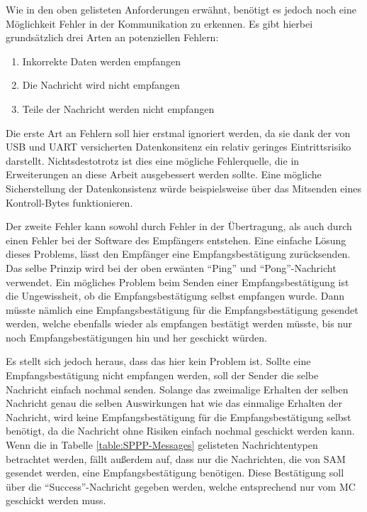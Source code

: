 Wie in den oben gelisteten Anforderungen erwähnt, benötigt es jedoch noch eine Möglichkeit Fehler in der Kommunikation zu erkennen.
Es gibt hierbei grundsätzlich drei Arten an potenziellen Fehlern:

\begin{enumerate}
    \item Inkorrekte Daten werden empfangen
    \item Die Nachricht wird nicht empfangen
    \item Teile der Nachricht werden nicht empfangen
\end{enumerate}

Die erste Art an Fehlern soll hier erstmal ignoriert werden, da sie dank der von USB und \ac{UART} versicherten Datenkonsitenz ein relativ geringes Eintrittsrisiko darstellt.
Nichtsdestotrotz ist dies eine mögliche Fehlerquelle, die in Erweiterungen an diese Arbeit ausgebessert werden sollte.
Eine mögliche Sicherstellung der Datenkonsistenz würde beispielsweise über das Mitsenden eines Kontroll-Bytes funktionieren.

Der zweite Fehler kann sowohl durch Fehler in der Übertragung, als auch durch einen Fehler bei der Software des Empfängers entstehen.
Eine einfache Lösung dieses Problems, lässt den Empfänger eine Empfangsbestätigung zurücksenden.
Das selbe Prinzip wird bei der oben erwänten \enquote{Ping} und \enquote{Pong}-Nachricht verwendet.
Ein mögliches Problem beim Senden einer Empfangsbestätigung ist die Ungewissheit, ob die Empfangsbestätigung selbst empfangen wurde. \newline
Dann müsste nämlich eine Empfangsbestätigung für die Empfangsbestätigung gesendet werden, welche ebenfalls wieder als empfangen bestätigt werden müsste, bis nur noch Empfangsbestätigungen hin und her geschickt würden.

Es stellt sich jedoch heraus, dass das hier kein Problem ist.
Sollte eine Empfangsbestätigung nicht empfangen werden, soll der Sender die selbe Nachricht einfach nochmal senden. \newline
Solange das zweimalige Erhalten der selben Nachricht genau die selben Auswirkungen hat wie das einmalige Erhalten der Nachricht, wird keine Empfangsbestätigung für die Empfangsbestätigung selbst benötigt, da die Nachricht ohne Risiken einfach nochmal geschickt werden kann.
Wenn die in Tabelle \ref{table:SPPP-Messages} gelisteten Nachrichtentypen betrachtet werden, fällt außerdem auf, dass nur die Nachrichten, die von \ac{SAM} gesendet werden, eine Empfangsbestätigung benötigen.
Diese Bestätigung soll über die \enquote{Success}-Nachricht gegeben werden, welche entsprechend nur vom \ac{MC} geschickt werden muss.

